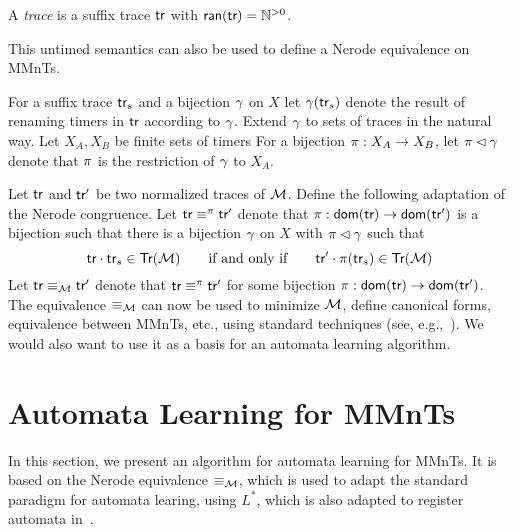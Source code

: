 A {\em trace} is a suffix trace $\textsf{tr}$ with ${\textsf{ran}}(\textsf{tr}) = {\mathbb N}^{>0}$.



This untimed semantics can also be used to define a Nerode equivalence on
MMnTs.

For a suffix trace $\textsf{tr}_s$ and a bijection $\gamma$ on $X$ let
$\gamma(\textsf{tr}_s)$ denote the result of renaming timers in $\textsf{tr}$
according to $\gamma$.
Extend $\gamma$ to sets of traces in the natural way.
Let $X_A, X_B$ be finite sets of timers
For a bijection $\pi: X_A \rightarrow X_B$, let
$\pi \lhd\gamma$ denote that $\pi$ is the restriction
of $\gamma$ to $X_A$.

Let $\textsf{tr}$ and $\textsf{tr}'$ be two normalized traces of ${\cal M}$.  Define the
following adaptation of the Nerode congruence.
Let $\textsf{tr} \equiv^{\pi} \textsf{tr}'$ denote that
$\pi: {\textsf{dom}}(\textsf{tr}) \rightarrow {\textsf{dom}}(\textsf{tr}')$ is a bijection
such that there is a bijection $\gamma$ on $X$ with
$\pi \lhd\gamma$ such that
\[
\textsf{tr}\cdot \textsf{tr}_s \in \textsf{Tr}({\cal M})
\qquad \mbox{if and only if} \qquad
\textsf{tr}'\cdot \pi(\textsf{tr}_s) \in \textsf{Tr}({\cal M})
\]
Let $\textsf{tr} \equiv_{{\cal M}} \textsf{tr}'$ denote that 
$\textsf{tr} \equiv^{\pi} \textsf{tr}'$ for some bijection
$\pi: {\textsf{dom}}(\textsf{tr}) \rightarrow {\textsf{dom}}(\textsf{tr}')$.
The equivalence $\equiv_{{\cal M}}$ can now be used to minimize ${\cal M}$, define
canonical forms, equivalence between MMnTs, etc., using standard techniques
(see, e.g.,~\cite{LeeY96}).
We would also want to use it as a basis for an automata learning algorithm.

\section{Automata Learning for MMnTs}
In this section, we present an algorithm for automata learning for MMnTs.
It is based on the Nerode equivalence $\equiv_{{\cal M}}$, which is used to adapt
the standard paradigm for automata learing, using $L^*$, which is also adapted
to register automata in~\cite{CasselHJS16}. 

